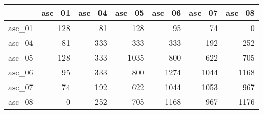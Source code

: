 \begin{tabular}{lrrrrrr}
\toprule
 & asc_01 & asc_04 & asc_05 & asc_06 & asc_07 & asc_08 \\
\midrule
asc_01 & 128 & 81 & 128 & 95 & 74 & 0 \\
asc_04 & 81 & 333 & 333 & 333 & 192 & 252 \\
asc_05 & 128 & 333 & 1035 & 800 & 622 & 705 \\
asc_06 & 95 & 333 & 800 & 1274 & 1044 & 1168 \\
asc_07 & 74 & 192 & 622 & 1044 & 1053 & 967 \\
asc_08 & 0 & 252 & 705 & 1168 & 967 & 1176 \\
\bottomrule
\end{tabular}
